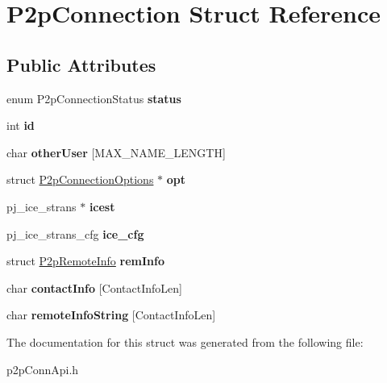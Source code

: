 \hypertarget{structP2pConnection}{
\section{P2pConnection Struct Reference}
\label{structP2pConnection}
}
\subsection*{Public Attributes}
\begin{DoxyCompactItemize}
\item 
\hypertarget{structP2pConnection_a8eecf9c7c3f62345634d3e74b023132f}{
enum P2pConnectionStatus {\bfseries status}}
\label{structP2pConnection_a8eecf9c7c3f62345634d3e74b023132f}

\item 
\hypertarget{structP2pConnection_a6b746b85e04fa05a18686d71766567b3}{
int {\bfseries id}}
\label{structP2pConnection_a6b746b85e04fa05a18686d71766567b3}

\item 
\hypertarget{structP2pConnection_a9770ff786603ce7fa98ae8926db68c2c}{
char {\bfseries otherUser} \mbox{[}MAX\_\-NAME\_\-LENGTH\mbox{]}}
\label{structP2pConnection_a9770ff786603ce7fa98ae8926db68c2c}

\item 
\hypertarget{structP2pConnection_acb10e9af725eca3591e2f7ff5bab4116}{
struct \hyperlink{structP2pConnectionOptions}{P2pConnectionOptions} $\ast$ {\bfseries opt}}
\label{structP2pConnection_acb10e9af725eca3591e2f7ff5bab4116}

\item 
\hypertarget{structP2pConnection_a5ebd408367ac9c8952201594532b9486}{
pj\_\-ice\_\-strans $\ast$ {\bfseries icest}}
\label{structP2pConnection_a5ebd408367ac9c8952201594532b9486}

\item 
\hypertarget{structP2pConnection_a5bfc67de65c4a87e1b5102f8d0dd9d34}{
pj\_\-ice\_\-strans\_\-cfg {\bfseries ice\_\-cfg}}
\label{structP2pConnection_a5bfc67de65c4a87e1b5102f8d0dd9d34}

\item 
\hypertarget{structP2pConnection_a0d4397b78e4420f3ff02a3f392a3a339}{
struct \hyperlink{structP2pRemoteInfo}{P2pRemoteInfo} {\bfseries remInfo}}
\label{structP2pConnection_a0d4397b78e4420f3ff02a3f392a3a339}

\item 
\hypertarget{structP2pConnection_a3e7a2ecb97838853b19ca983f4711546}{
char {\bfseries contactInfo} \mbox{[}ContactInfoLen\mbox{]}}
\label{structP2pConnection_a3e7a2ecb97838853b19ca983f4711546}

\item 
\hypertarget{structP2pConnection_aa0c0a1ff5550911d81d881309d86d535}{
char {\bfseries remoteInfoString} \mbox{[}ContactInfoLen\mbox{]}}
\label{structP2pConnection_aa0c0a1ff5550911d81d881309d86d535}

\end{DoxyCompactItemize}


The documentation for this struct was generated from the following file:\begin{DoxyCompactItemize}
\item 
p2pConnApi.h\end{DoxyCompactItemize}
